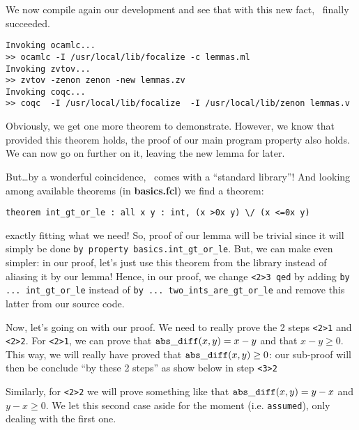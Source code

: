 \documentclass[11pt,a4paper,twoside,onecolumn,fullpage]{article}
\begin{document}
{\scriptsize
}

We now compile again our development and see that with this new fact,
\zenon\ finally succeeded.

{\scriptsize
\begin{verbatim}
Invoking ocamlc...
>> ocamlc -I /usr/local/lib/focalize -c lemmas.ml
Invoking zvtov...
>> zvtov -zenon zenon -new lemmas.zv
Invoking coqc...                                                
>> coqc  -I /usr/local/lib/focalize  -I /usr/local/lib/zenon lemmas.v
\end{verbatim}}

Obviously, we get one more theorem to demonstrate. However, we know
that provided this theorem holds, the proof of our main program
property also holds. We can now go on further on it, leaving the new
lemma for later.

But\ldots by a wonderful coincidence, \focal\ comes with a ``standard
library''! And looking among available theorems (in
\textbf{basics.fcl}) we find a theorem:

{\scriptsize
\begin{lstlisting}
theorem int_gt_or_le : all x y : int, (x >0x y) \/ (x <=0x y)
\end{lstlisting}}

\noindent exactly fitting what we need! So, proof of our lemma will be
trivial since it will simply be done \lstinline"by property basics.int_gt_or_le".
But, we can make even simpler: in our proof, let's just use this
theorem from the library instead of aliasing it by our lemma! Hence,
in our proof, we change \lstinline"<2>3 qed" by adding
\lstinline"by ... int_gt_or_le" instead of 
\lstinline"by ... two_ints_are_gt_or_le" and remove this latter from
our source code.

\medskip
Now, let's going on with our proof. We need to really prove the 2
steps \lstinline"<2>1" and \lstinline"<2>2". For \lstinline"<2>1", we
can prove that ${\tt abs\_diff} (x, y) = x - y$ and that
$x - y \ge 0$. This way, we will really have proved that
${\tt abs\_diff} (x, y) \ge 0$: our sub-proof will then be conclude ``by
these 2 steps'' as show below in step \lstinline"<3>2"

Similarly, for \lstinline"<2>2" we will prove something like that
${\tt abs\_diff} (x, y) = y - x$ and $y - x \ge 0$. We let this second case
aside for the moment (i.e. \lstinline"assumed"), only dealing with the
first one.

{\scriptsize
}
\end{document}
